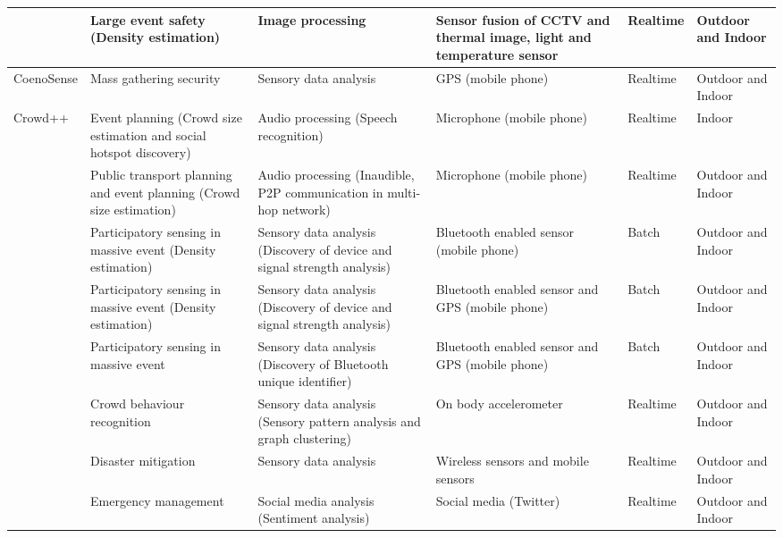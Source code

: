 \begin{center}
\begin{longtable}{|p{2cm}|p{2.5cm}|p{2.5cm}|p{2cm}|p{1.5cm}|p{2cm}|}
		\hline
		\textcite{Yaseen2013} & Large event safety (Density estimation) & Image processing & Sensor fusion of CCTV and thermal image, light and temperature sensor& Realtime & Outdoor and Indoor \\
		\hline
		CoenoSense \parencite{Wirz2012} & Mass gathering security & Sensory data analysis & GPS (mobile phone) & Realtime & Outdoor and Indoor \\
		\hline
		Crowd++ \parencite{Xu2013} & Event planning (Crowd size estimation and social hotspot discovery) & Audio processing (Speech recognition) & Microphone (mobile phone) & Realtime & Indoor\\
		\hline
		\textcite{Kannan2012} & Public transport planning and  event planning (Crowd size estimation) & Audio processing (Inaudible, P2P communication in multi-hop network) & Microphone (mobile phone) & Realtime & Outdoor and Indoor \\
		\hline
		\textcite{Weppner2011} & Participatory sensing in massive event (Density estimation) & Sensory data analysis (Discovery of device and signal strength analysis) & Bluetooth enabled sensor (mobile phone) & Batch & Outdoor and Indoor \\
		\hline
		\textcite{Weppner2013} & Participatory sensing in massive event (Density estimation) & Sensory data analysis (Discovery of device and signal strength analysis) & Bluetooth enabled sensor and GPS (mobile phone) & Batch & Outdoor and Indoor \\
		\hline
		\textcite{Stopczynski2013} & Participatory sensing in massive event & Sensory data analysis (Discovery of Bluetooth unique identifier) & Bluetooth enabled sensor and GPS (mobile phone) & Batch & Outdoor and Indoor \\
		\hline
		\textcite{Roggen2011} & Crowd behaviour recognition & Sensory data analysis (Sensory pattern analysis and graph clustering) & On body accelerometer & Realtime & Outdoor and Indoor \\
		\hline
		\textcite{Ramesh2014} & Disaster mitigation & Sensory data analysis & Wireless sensors and mobile sensors & Realtime & Outdoor and Indoor \\
		\hline
		\textcite{DelirHaghighi2013} & Emergency management & Social media analysis (Sentiment analysis) & Social media (Twitter) & Realtime & Outdoor and Indoor \\
		\hline
	\end{longtable}
\end{center}

